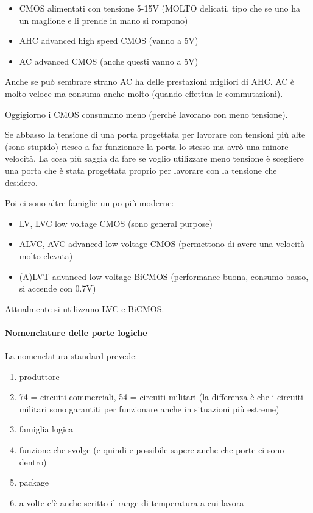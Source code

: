 \documentclass[
]{article}
\providecommand{\tightlist}{%
  \setlength{\itemsep}{0pt}\setlength{\parskip}{0pt}}
\begin{document}
\begin{itemize}
\tightlist
\item
  CMOS alimentati con tensione 5-15V (MOLTO delicati, tipo che se uno ha
  un maglione e li prende in mano si rompono)
\item
  AHC advanced high speed CMOS (vanno a 5V)
\item
  AC advanced CMOS (anche questi vanno a 5V)
\end{itemize}

Anche se può sembrare strano AC ha delle prestazioni migliori di AHC. AC
è molto veloce ma consuma anche molto (quando effettua le commutazioni).

Oggigiorno i CMOS consumano meno (perché lavorano con meno tensione).

Se abbasso la tensione di una porta progettata per lavorare con tensioni
più alte (sono stupido) riesco a far funzionare la porta lo stesso ma
avrò una minore velocità. La cosa più saggia da fare se voglio
utilizzare meno tensione è scegliere una porta che è stata progettata
proprio per lavorare con la tensione che desidero.

Poi ci sono altre famiglie un po più moderne:

\begin{itemize}
\tightlist
\item
  LV, LVC low voltage CMOS (sono general purpose)
\item
  ALVC, AVC advanced low voltage CMOS (permettono di avere una velocità
  molto elevata)
\item
  (A)LVT advanced low voltage BiCMOS (performance buona, consumo basso,
  si accende con 0.7V)
\end{itemize}

Attualmente si utilizzano LVC e BiCMOS.

\paragraph{Nomenclature delle porte
logiche}\label{nomenclature-delle-porte-logiche}

La nomenclatura standard prevede:

\begin{enumerate}
\def\labelenumi{\arabic{enumi}.}
\tightlist
\item
  produttore
\item
  74 = circuiti commerciali, 54 = circuiti militari (la differenza è che
  i circuiti militari sono garantiti per funzionare anche in situazioni
  più estreme)
\item
  famiglia logica
\item
  funzione che svolge (e quindi e possibile sapere anche che porte ci
  sono dentro)
\item
  package
\item
  a volte c'è anche scritto il range di temperatura a cui lavora
\end{enumerate}
\end{document}
